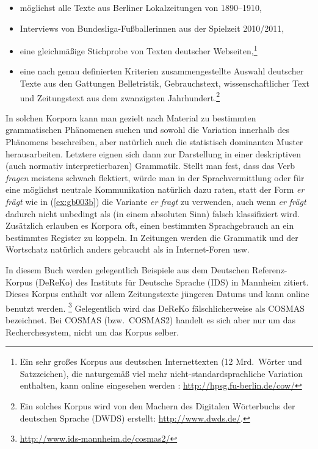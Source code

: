 \begin{itemize}\Lf
  \item möglichst alle Texte aus Berliner Lokalzeitungen von 1890--1910,
  \item Interviews von Bundesliga-Fußballerinnen aus der Spielzeit 2010\slash 2011,
  \item eine gleichmäßige Stichprobe von Texten deutscher Webseiten,\footnote{Ein sehr großes Korpus aus deutschen Internettexten (12 Mrd.\ Wörter und Satzzeichen), die naturgemäß viel mehr nicht-standardsprachliche Variation enthalten, kann online eingesehen werden \citep{Schaefer-Bildhauer2012a}: \url{http://hpsg.fu-berlin.de/cow/}}
  \item eine nach genau definierten Kriterien zusammengestellte Auswahl deutscher Texte aus den Gattungen Belletristik, Gebrauchstext, wissenschaftlicher Text und Zeitungstext aus dem zwanzigsten Jahrhundert.\footnote{Ein solches Korpus wird von den Machern des Digitalen Wörterbuchs der deutschen Sprache (DWDS) erstellt: \url{http://www.dwds.de/}.}
\end{itemize}

In solchen Korpora kann man gezielt nach Material zu bestimmten grammatischen Phänomenen suchen und sowohl die Variation innerhalb des Phänomens beschreiben, aber natürlich auch die statistisch dominanten Muster herausarbeiten.
Letztere eignen sich dann zur Darstellung in einer deskriptiven (auch normativ interpretierbaren) Grammatik.
Stellt man \zB fest, dass das Verb \textit{fragen} meistens schwach flektiert, würde man in der Sprachvermittlung oder für eine möglichst neutrale Kommunikation natürlich dazu raten, statt der Form \textit{er frägt} wie in (\ref{ex:gb003b}) die Variante \textit{er fragt} zu verwenden, auch wenn \textit{er frägt} dadurch nicht unbedingt als (in einem absoluten Sinn) falsch klassifiziert wird.
Zusätzlich erlauben es Korpora oft, einen bestimmten Sprachgebrauch an ein bestimmtes Register zu koppeln.
In Zeitungen werden die Grammatik und der Wortschatz natürlich anders gebraucht als in Internet-Foren usw.

In diesem Buch werden gelegentlich Beispiele aus dem Deutschen Referenz-Korpus (DeReKo) des Instituts für Deutsche Sprache (IDS) in Mannheim zitiert.
Dieses Korpus enthält vor allem Zeitungstexte jüngeren Datums und kann online benutzt werden.%
\footnote{\url{http://www.ids-mannheim.de/cosmas2/}}
Gelegentlich wird das DeReKo fälschlicherweise als COSMAS bezeichnet.
Bei COSMAS (bzw.\ COSMAS2) handelt es sich aber nur um das Recherchesystem, nicht um das Korpus selber.


